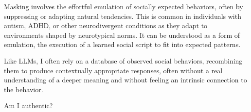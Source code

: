 Masking involves the effortful emulation of socially expected behaviors, often by suppressing or adapting natural tendencies. This is common in individuals with autism, ADHD, or other neurodivergent conditions as they adapt to environments shaped by neurotypical norms. It can be understood as a form of emulation, the execution of a learned social script to fit into expected patterns.

Like LLMs, I often rely on a database of observed social behaviors, recombining them to produce contextually appropriate responses, often without a real understanding of a deeper meaning and without feeling an intrinsic connection to the behavior.

Am I authentic?


